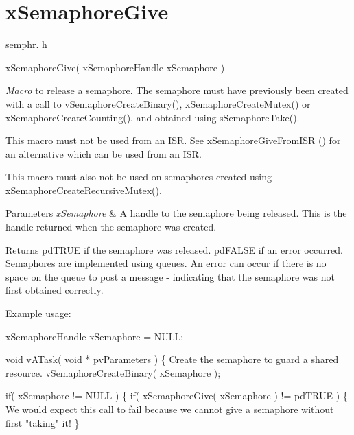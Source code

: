 \hypertarget{group__x_semaphore_give}{\section{x\-Semaphore\-Give}
\label{group__x_semaphore_give}
}
semphr. h 
\begin{DoxyPre}xSemaphoreGive( xSemaphoreHandle xSemaphore )\end{DoxyPre}


{\itshape Macro} to release a semaphore. The semaphore must have previously been created with a call to v\-Semaphore\-Create\-Binary(), x\-Semaphore\-Create\-Mutex() or x\-Semaphore\-Create\-Counting(). and obtained using s\-Semaphore\-Take().

This macro must not be used from an I\-S\-R. See x\-Semaphore\-Give\-From\-I\-S\-R () for an alternative which can be used from an I\-S\-R.

This macro must also not be used on semaphores created using x\-Semaphore\-Create\-Recursive\-Mutex().


\begin{DoxyParams}{Parameters}
{\em x\-Semaphore} & A handle to the semaphore being released. This is the handle returned when the semaphore was created.\\
\hline
\end{DoxyParams}
\begin{DoxyReturn}{Returns}
pd\-T\-R\-U\-E if the semaphore was released. pd\-F\-A\-L\-S\-E if an error occurred. Semaphores are implemented using queues. An error can occur if there is no space on the queue to post a message -\/ indicating that the semaphore was not first obtained correctly.
\end{DoxyReturn}
Example usage\-: 
\begin{DoxyPre}
 xSemaphoreHandle xSemaphore = NULL;\end{DoxyPre}



\begin{DoxyPre} void vATask( void * pvParameters )
 \{
Create the semaphore to guard a shared resource.
    vSemaphoreCreateBinary( xSemaphore );\end{DoxyPre}



\begin{DoxyPre}    if( xSemaphore != NULL )
    \{
        if( xSemaphoreGive( xSemaphore ) != pdTRUE )
        \{
We would expect this call to fail because we cannot give
a semaphore without first "taking" it!
        \}\end{DoxyPre}



